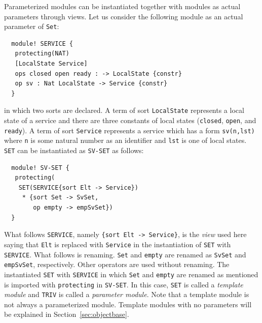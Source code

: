 \documentclass[12pt]{report}
\newcommand{\stt}[1]{{\small{\tt {#1}}}}
\begin{document}
Parameterized modules can be instantiated together with modules as actual
parameters through views. Let us consider the following module
as an actual parameter of {\tt Set}:
\small
\begin{verbatim}
  module! SERVICE {
   protecting(NAT)
   [LocalState Service]
   ops closed open ready : -> LocalState {constr}
   op sv : Nat LocalState -> Service {constr}
  }
\end{verbatim}
\normalsize
in which two sorts are declared.  A term of sort {\tt LocalState}
represents a local state of a service and there are three constants of
local states ({\tt closed}, {\tt open}, and {\tt ready}).  A term of
sort {\tt Service} represents a service which has a form
\stt{sv(n,lst)} where {\tt n} is some natural number as an identifier
and {\tt lst} is one of local states.  {\tt SET} can be instantiated
as {\tt SV-SET} as follows:
\small
\begin{verbatim}
  module! SV-SET {
   protecting(
    SET(SERVICE{sort Elt -> Service})
     * {sort Set -> SvSet,
        op empty -> empSvSet})
  }
\end{verbatim}
\normalsize
What follows {\tt SERVICE}, namely \stt{\{sort Elt -> Service\}}, is
the {\it view} used here saying that {\tt Elt} is replaced with
{\tt Service} in the instantiation of {\tt SET} with
{\tt SERVICE}. What follows {\tt *} is renaming. {\tt Set} and
{\tt empty} are renamed as {\tt SvSet} and {\tt empSvSet},
respectively. Other operators are used without renaming.
The instantiated {\tt SET} with {\tt SERVICE} in which {\tt Set} and
{\tt empty} are renamed as mentioned is imported with {\tt protecting}
in {\tt SV-SET}. In this case, {\tt SET} is called a {\it template
  module} and {\tt TRIV} is called a {\it parameter module}. Note that
a template module is not always a parameterized module. Template modules
with no parameters will be explained in Section~\ref{sec:objectbase}.
\end{document}

